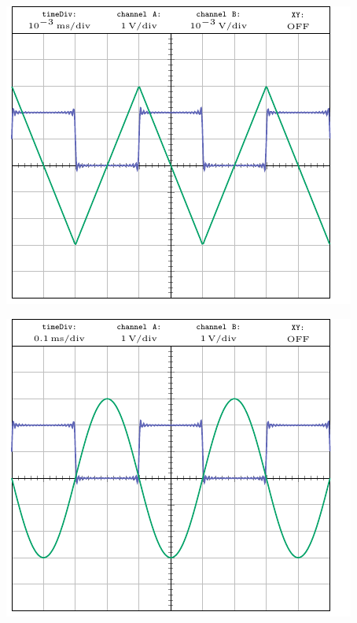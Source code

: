 \documentclass[a4paper,french,bookmarks]{article}
\begin{document}
    \begin{center}
        \begin{minipage}{0.95\linewidth}
            \begin{minipage}{0.48\linewidth}
                \begin{center}
                    \includegraphics{Figures/MPIPHDM2F1.pdf}
                \end{center}
            \end{minipage}
            \hfill
            \begin{minipage}{0.48\linewidth}
                \begin{center}
                    \includegraphics{Figures/MPIPHDM2F2.pdf}
                \end{center}
            \end{minipage}
        \end{minipage}
    \end{center}
    
\end{document}
